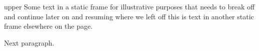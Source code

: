 \documentclass[12pt]{article}
\begin{document}
 \begin{staticcontents*}{upper}
Some text in a static frame for 
illustrative purposes that needs to
break off and continue later on and
resuming where we left off
this is text in another static frame
elsewhere on the page. 

Next paragraph.
\end{staticcontents*} 

\lipsum[1-3] 
\end{document}

